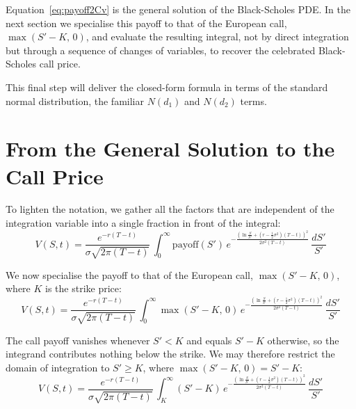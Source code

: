 \documentclass[a4paper,12pt]{article}
\numberwithin{equation}{section}
\begin{document}
Equation~\eqref{eq:payoff2Cv} is the general solution of the Black-Scholes PDE. In the next section we specialise
this payoff to that of the European call, $\max(S'-K,\,0)$, and evaluate the
resulting integral, not by direct integration but through a sequence of changes
of variables, to recover the celebrated Black-Scholes call price.

This final step will deliver the closed-form formula in terms of the standard
normal distribution, the familiar $N(d_1)$ and $N(d_2)$ terms.

\section{From the General Solution to the Call Price}

To lighten the notation, we gather all the factors that are independent of the
integration variable into a single fraction in front of the integral:
\begin{equation}\label{eq:v-simplified}
  V(S,t) = \frac{e^{-r(T-t)}}{\sigma\sqrt{2\pi(T-t)}}\,
    \int_{0}^{\infty} \mathrm{payoff}(S')\,
   e^{-\frac{\left(\ln\frac{S}{S'} + \left(r - \frac{1}{2}\sigma^2\right)(T-t)\right)^2}{2\sigma^2(T-t)}}
  \,\frac{dS'}{S'}
\end{equation}

We now specialise the payoff to that of the European call,
$\max(S'-K,\,0)$, where $K$ is the strike price:
\begin{equation}\label{eq:v-callpayoff}
  V(S,t) = \frac{e^{-r(T-t)}}{\sigma\sqrt{2\pi(T-t)}}\,
    \int_{0}^{\infty} \max(S'-K,\,0)\,
   e^{-\frac{\left(\ln\frac{S}{S'} + \left(r - \frac{1}{2}\sigma^2\right)(T-t)\right)^2}{2\sigma^2(T-t)}}
  \,\frac{dS'}{S'}
\end{equation}

The call payoff vanishes whenever $S' < K$ and equals $S'-K$ otherwise, so the
integrand contributes nothing below the strike. We may therefore restrict the
domain of integration to $S' \ge K$, where $\max(S'-K,\,0) = S'-K$:
\begin{equation}\label{eq:v-restricted}
  V(S,t) = \frac{e^{-r(T-t)}}{\sigma\sqrt{2\pi(T-t)}}\,
    \int_{K}^{\infty} (S'-K)\,
   e^{-\frac{\left(\ln\frac{S}{S'} + \left(r - \frac{1}{2}\sigma^2\right)(T-t)\right)^2}{2\sigma^2(T-t)}}
  \,\frac{dS'}{S'}
\end{equation}
\end{document}
